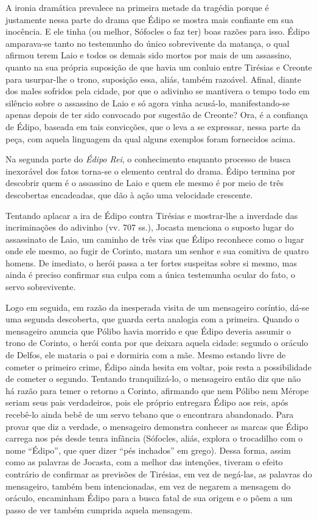 A ironia dramática prevalece na primeira metade da tragédia porque é
justamente nessa parte do drama que Édipo se mostra mais confiante em
sua inocência. E ele tinha (ou melhor, Sófocles o faz ter) boas razões
para isso. Édipo amparava-se tanto no testemunho do único sobrevivente
da matança, o qual afirmou terem Laio e todos os demais sido mortos por
mais de um assassino, quanto na sua própria suposição de que havia um
conluio entre Tirésias e Creonte para usurpar-lhe o trono, suposição
essa, aliás, também razoável. Afinal, diante dos males sofridos pela
cidade, por que o adivinho se mantivera o tempo todo em silêncio sobre o
assassino de Laio e só agora vinha acusá-lo, manifestando-se apenas
depois de ter sido convocado por sugestão de Creonte? Ora, é a confiança
de Édipo, baseada em tais convicções, que o leva a se expressar, nessa
parte da peça, com aquela linguagem da qual alguns exemplos foram
fornecidos acima.

Na segunda parte do \emph{Édipo Rei}, o conhecimento enquanto
processo de busca inexorável dos fatos torna-se o elemento central do
drama. Édipo termina por descobrir quem é o assassino de Laio e quem ele
mesmo é por meio de três descobertas encadeadas, que dão à ação uma
velocidade crescente.

Tentando aplacar a ira de Édipo contra Tirésias e mostrar-lhe a
inverdade das incriminações do adivinho (vv. 707 ss.), Jocasta menciona
o suposto lugar do assassinato de Laio, um caminho de três vias que
Édipo reconhece como o lugar onde ele mesmo, ao fugir de Corinto, matara
um senhor e sua comitiva de quatro homens. De imediato, o herói passa 
a ter fortes suspeitas sobre si mesmo, mas ainda é preciso confirmar sua
culpa com a única testemunha ocular do fato, o servo sobrevivente.

Logo em seguida, em razão da inesperada visita de um mensageiro
coríntio, dá-se uma segunda descoberta, que guarda certa analogia com a
primeira. Quando o mensageiro anuncia que Pólibo havia morrido e que
Édipo deveria assumir o trono de Corinto, o herói conta por que
deixara aquela cidade: segundo o oráculo de Delfos, ele mataria o pai e
dormiria com a mãe. Mesmo estando livre de cometer o primeiro crime, Édipo
ainda hesita em voltar, pois resta a possibilidade de cometer o segundo.
Tentando tranquilizá-lo, o mensageiro então diz que não há razão para
temer o retorno a Corinto, afirmando que nem Pólibo nem Mérope seriam
seus pais verdadeiros, pois ele próprio entregara Édipo aos reis, após
recebê-lo ainda bebê de um servo tebano que o encontrara abandonado.
Para provar que diz a verdade, o mensageiro demonstra conhecer as marcas
que Édipo carrega nos pés desde tenra infância (Sófocles, aliás, explora
o trocadilho com o nome ``Édipo'', que quer dizer ``pés inchados'' em
grego). Dessa forma, assim como as palavras de Jocasta, com a melhor das
intenções, tiveram o efeito contrário de confirmar as previsões de
Tirésias, em vez de negá-las, as palavras do mensageiro, também bem
intencionadas, em vez de negarem a mensagem do oráculo, encaminham Édipo
para a busca fatal de sua origem e o põem a um passo de ver também
cumprida aquela mensagem.

